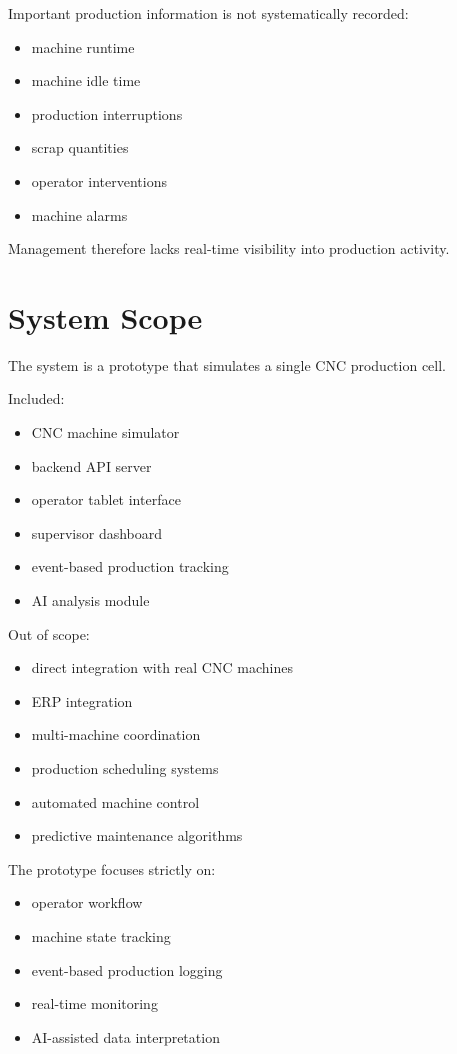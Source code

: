 \documentclass[11pt]{article}
\begin{document}
Important production information is not systematically recorded:
\begin{itemize}
\item machine runtime
\item machine idle time
\item production interruptions
\item scrap quantities
\item operator interventions
\item machine alarms
\end{itemize}

Management therefore lacks real-time visibility into production activity.

\section{System Scope}
The system is a prototype that simulates a single CNC production cell.

Included:
\begin{itemize}
\item CNC machine simulator
\item backend API server
\item operator tablet interface
\item supervisor dashboard
\item event-based production tracking
\item AI analysis module
\end{itemize}

Out of scope:
\begin{itemize}
\item direct integration with real CNC machines
\item ERP integration
\item multi-machine coordination
\item production scheduling systems
\item automated machine control
\item predictive maintenance algorithms
\end{itemize}

The prototype focuses strictly on:
\begin{itemize}
\item operator workflow
\item machine state tracking
\item event-based production logging
\item real-time monitoring
\item AI-assisted data interpretation
\end{itemize}
\end{document}
